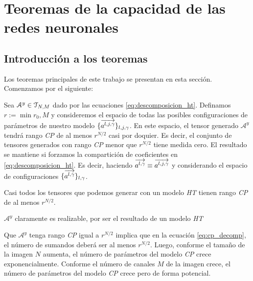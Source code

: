 \chapter{Teoremas de la capacidad de las redes neuronales}

\section{Introducción a los teoremas}

Los teoremas principales de este trabajo se presentan en esta sección. Comenzamos por el siguiente:

\begin{teorema}

Sea $\mathcal{A}^y \in \mathcal{T}_{N, M}$ dado por las ecuaciones \eqref{eq:descomposicion_ht}. Definamos $r := \min{r_0, M}$ y consideremos el espacio de todas las posibles configuraciones de parámetros de nuestro modelo $\{ \overrightarrow{a^{l, j, \gamma}} \}_{l, j, \gamma}$. En este espacio, el tensor generado $\mathcal{A}^y$ tendrá rango \textit{CP} de al menos $r^{N/2}$ casi por doquier. Es decir, el conjunto de tensores generados con rango \textit{CP} menor que $r^{N/2}$ tiene medida cero. El resultado se mantiene si forzamos la compartición de coeficientes en \eqref{eq:descomposicion_ht}. Es decir, haciendo $\overrightarrow{a^{l, \gamma}} \equiv \overrightarrow{a^{l, j, \gamma}}$ y considerando el espacio de configuraciones $\{ \overrightarrow{a^{l, \gamma}}  \}_{l, \gamma}$.

\end{teorema}

\begin{observacion}

    Casi todos los tensores que podemos generar con un modelo \textit{HT} tienen rango \textit{CP} de al menos $r^{N/2}$.

\end{observacion}

\begin{observacion}
    $\mathcal{A}^y$ claramente es realizable, por ser el resultado de un modelo \textit{HT}
\end{observacion}

\begin{observacion}

    Que $\mathcal{A}^y$ tenga rango \textit{CP} igual a $r^{N/2}$ implica que en la ecuación \eqref{eq:cp_decomp}, el número de sumandos deberá ser al menos $r^{N/2}$. Luego, conforme el tamaño de la imagen $N$ aumenta, el número de parámetros del modelo \textit{CP} crece exponencialmente. Conforme el número de canales $M$ de la imagen crece, el número de parámetros del modelo \textit{CP} crece pero de forma potencial.

\end{observacion}

